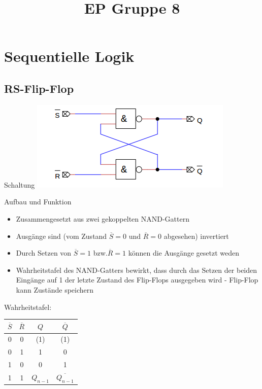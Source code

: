 \documentclass[compress,11pt]{beamer}
\title{EP Gruppe 8}
\begin{document}
\section{Sequentielle Logik}
\subsection{RS-Flip-Flop}
\begin{frame}
\begin{block}{Schaltung}
\includegraphics[scale=0.7]{rs}
\end{block}
\end{frame}
\begin{frame}
\begin{block}{Aufbau und Funktion}
\begin{itemize}
\item Zusammengesetzt aus zwei gekoppelten NAND-Gattern
\item Ausgänge sind (vom Zustand $\overline{S} = 0$ und $\overline{R} = 0$ abgesehen) invertiert
\item Durch Setzen von $\overline{S} = 1$ bzw.$\overline{R} = 1$ können die Ausgänge gesetzt weden
\item Wahrheitstafel des NAND-Gatters bewirkt, dass durch das Setzen der beiden Eingänge auf 1 der letzte Zustand des Flip-Flops ausgegeben wird - Flip-Flop kann Zustände speichern
\end{itemize}
\end{block}
\end{frame}
\begin{frame}
Wahrheitstafel:\\
\begin{tabular}{|c|c||c|c|}
\hline 
$\overline{S}$ & $\overline{R}$ & $Q$ & $\overline{Q}$ \\ 
\hline 
0 & 0 & (1) & (1) \\ 

0 & 1 & 1 & 0 \\ 
 
1 & 0 & 0 & 1 \\ 
 
1 & 1 & $Q_{n-1}$ & $\overline{Q_{n-1}}$ \\ 
\hline 
\end{tabular} 




\end{frame}
\end{document}
